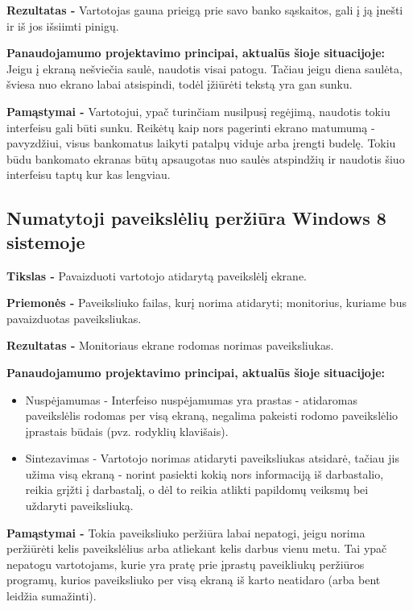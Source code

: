 ﻿\documentclass[a4paper, 12pt]{article}
\begin{document}
		\textbf{Rezultatas -}
		Vartotojas gauna prieigą prie savo banko sąskaitos, gali į ją įnešti ir iš jos išsiimti pinigų.

		\textbf{Panaudojamumo projektavimo principai, aktualūs šioje situacijoje:}\\
		Jeigu į ekraną nešviečia saulė, naudotis visai patogu.
		Tačiau jeigu diena saulėta, šviesa nuo ekrano labai atsispindi, todėl įžiūrėti tekstą yra gan sunku.

		\textbf{Pamąstymai -}
		Vartotojui, ypač turinčiam nusilpusį regėjimą, naudotis tokiu interfeisu gali būti sunku.
		Reikėtų kaip nors pagerinti ekrano matumumą - pavyzdžiui, visus bankomatus laikyti patalpų viduje arba įrengti budelę.
		Tokiu būdu bankomato ekranas būtų apsaugotas nuo saulės atspindžių ir naudotis šiuo interfeisu taptų kur kas lengviau.

		
	\subsection{Numatytoji paveikslėlių peržiūra Windows 8 sistemoje}
		\textbf{Tikslas -}
		Pavaizduoti vartotojo atidarytą paveikslėlį ekrane.
		
		\textbf{Priemonės -}
		Paveiksliuko failas, kurį norima atidaryti; monitorius, kuriame bus pavaizduotas paveiksliukas.

		\textbf{Rezultatas -}
		Monitoriaus ekrane rodomas norimas paveiksliukas.

		\textbf{Panaudojamumo projektavimo principai, aktualūs šioje situacijoje:}
		\begin{itemize}
		\item Nuspėjamumas - Interfeiso nuspėjamumas yra prastas - atidaromas paveikslėlis rodomas per visą ekraną, negalima pakeisti rodomo paveikslėlio įprastais būdais (pvz. rodyklių klavišais).
		\item Sintezavimas - Vartotojo norimas atidaryti paveiksliukas atsidarė, tačiau jis užima visą ekraną - norint pasiekti kokią nors informaciją iš darbastalio, reikia grįžti į darbastalį, o dėl to reikia atlikti papildomų veiksmų bei uždaryti paveiksliuką.
		\end{itemize}

		\textbf{Pamąstymai -}
		Tokia paveiksliuko peržiūra labai nepatogi, jeigu norima peržiūrėti kelis paveikslėlius arba atliekant kelis darbus vienu metu.
		Tai ypač nepatogu vartotojams, kurie yra pratę prie įprastų paveikliukų peržiūros programų, kurios paveiksliuko per visą ekraną iš karto neatidaro (arba bent leidžia sumažinti).
\end{document}
